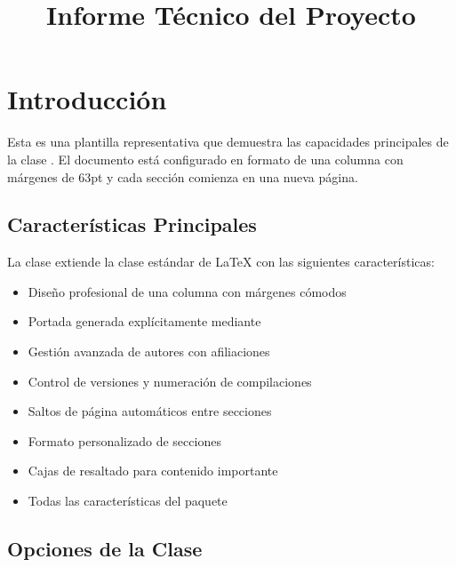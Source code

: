 \documentclass{pt-report}
\title{Informe Técnico del Proyecto}
\begin{document}
\maketitle

\tableofcontents
\ptlistoffigures
\ptlistoftables
\ptlistofcodes

\section{Introducción}

Esta es una plantilla representativa que demuestra las capacidades principales
de la clase . El documento está configurado en formato de
una columna con márgenes de 63pt y cada sección comienza en una nueva página.

\subsection{Características Principales}

La clase  extiende la clase estándar 
de \LaTeX{} con las siguientes características:

\begin{itemize}
    \item Diseño profesional de una columna con márgenes cómodos
    \item Portada generada explícitamente mediante \inlinecode{\string\maketitle}
    \item Gestión avanzada de autores con afiliaciones
    \item Control de versiones y numeración de compilaciones
    \item Saltos de página automáticos entre secciones
    \item Formato personalizado de secciones
    \item Cajas de resaltado para contenido importante
    \item Todas las características del paquete 
\end{itemize}

\subsection{Opciones de la Clase}
\end{document}
